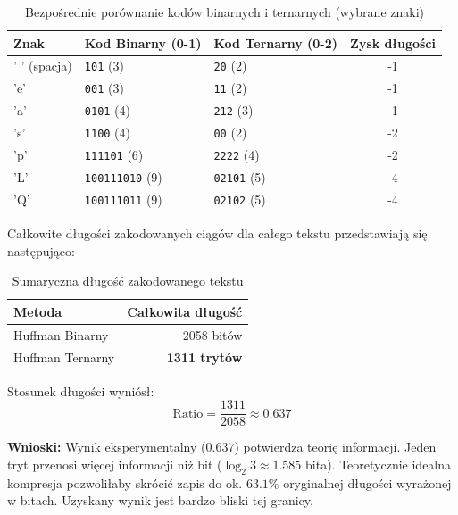 \documentclass{article}
\begin{document}
	\begin{table}[H]
		\centering
		\caption{Bezpośrednie porównanie kodów binarnych i ternarnych (wybrane znaki)}
		\begin{tabular}{lllc}
			\toprule
			\textbf{Znak} & \textbf{Kod Binarny (0-1)} & \textbf{Kod Ternarny (0-2)} & \textbf{Zysk długości} \\
			\midrule
			' ' (spacja) & \texttt{101} (3) & \texttt{20} (2) & -1 \\
			'e' & \texttt{001} (3) & \texttt{11} (2) & -1 \\
			'a' & \texttt{0101} (4) & \texttt{212} (3) & -1 \\
			's' & \texttt{1100} (4) & \texttt{00} (2) & -2 \\
			'p' & \texttt{111101} (6) & \texttt{2222} (4) & -2 \\
			'L' & \texttt{100111010} (9) & \texttt{02101} (5) & -4 \\
			'Q' & \texttt{100111011} (9) & \texttt{02102} (5) & -4 \\
			\bottomrule
		\end{tabular}
	\end{table}
	
	\noindent
	Całkowite długości zakodowanych ciągów dla całego tekstu przedstawiają się następująco:
	
	\begin{table}[H]
		\centering
		\caption{Sumaryczna długość zakodowanego tekstu}
		\begin{tabular}{lr}
			\toprule
			\textbf{Metoda} & \textbf{Całkowita długość} \\
			\midrule
			Huffman Binarny & 2058 bitów \\
			Huffman Ternarny & \textbf{1311 trytów} \\
			\bottomrule
		\end{tabular}
	\end{table}
	
	\noindent
	Stosunek długości wyniósł:
	$$ \text{Ratio} = \frac{1311}{2058} \approx 0.637 $$
	
	\noindent
	\textbf{Wnioski:} Wynik eksperymentalny ($0.637$) potwierdza teorię informacji. Jeden tryt przenosi więcej informacji niż bit ($\log_2 3 \approx 1.585$ bita). Teoretycznie idealna kompresja pozwoliłaby skrócić zapis do ok. $63.1\%$ oryginalnej długości wyrażonej w bitach. Uzyskany wynik jest bardzo bliski tej granicy.
\end{document}
